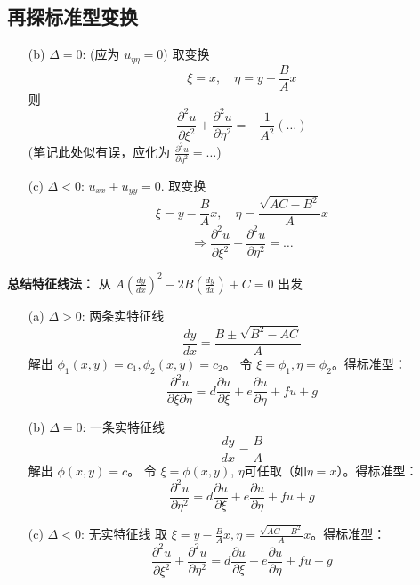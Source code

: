 \documentclass{article}
\begin{document}
	\subsection*{再探标准型变换}
	\begin{itemize}
		\item[(b)] $\Delta = 0$: (应为 $u_{\eta\eta}=0$)
		取变换
		$$ \xi = x, \quad \eta = y - \frac{B}{A}x $$
		则
		$$ \frac{\partial^2 u}{\partial \xi^2} + \frac{\partial^2 u}{\partial \eta^2} = -\frac{1}{A^2}(\dots) $$
		(笔记此处似有误，应化为 $\frac{\partial^2 u}{\partial \eta^2} = \dots$)
		\item[(c)] $\Delta < 0$: $u_{xx} + u_{yy} = 0$.
		取变换
		$$ \xi = y - \frac{B}{A}x, \quad \eta = \frac{\sqrt{AC-B^2}}{A}x $$
		$$ \Rightarrow \frac{\partial^2 u}{\partial \xi^2} + \frac{\partial^2 u}{\partial \eta^2} = \dots $$
	\end{itemize}
	
	\textbf{总结特征线法：}
	从 $A(\frac{dy}{dx})^2 - 2B(\frac{dy}{dx}) + C = 0$ 出发
	\begin{enumerate}
		\item[(a)] $\Delta > 0$: 两条实特征线
		$$ \frac{dy}{dx} = \frac{B \pm \sqrt{B^2-AC}}{A} $$
		解出 $\phi_1(x,y)=c_1, \phi_2(x,y)=c_2$。
		令 $\xi = \phi_1, \eta = \phi_2$。得标准型：
		$$ \frac{\partial^2 u}{\partial \xi \partial \eta} = d \frac{\partial u}{\partial \xi} + e \frac{\partial u}{\partial \eta} + f u + g $$
		\item[(b)] $\Delta = 0$: 一条实特征线
		$$ \frac{dy}{dx} = \frac{B}{A} $$
		解出 $\phi(x,y)=c$。
		令 $\xi=\phi(x,y)$, $\eta$可任取（如$\eta=x$）。得标准型：
		$$ \frac{\partial^2 u}{\partial \eta^2} = d \frac{\partial u}{\partial \xi} + e \frac{\partial u}{\partial \eta} + f u + g $$
		\item[(c)] $\Delta < 0$: 无实特征线
		取 $\xi = y - \frac{B}{A}x, \eta = \frac{\sqrt{AC-B^2}}{A}x$。得标准型：
		$$ \frac{\partial^2 u}{\partial \xi^2} + \frac{\partial^2 u}{\partial \eta^2} = d \frac{\partial u}{\partial \xi} + e \frac{\partial u}{\partial \eta} + f u + g $$
	\end{enumerate}
	
\end{document}
